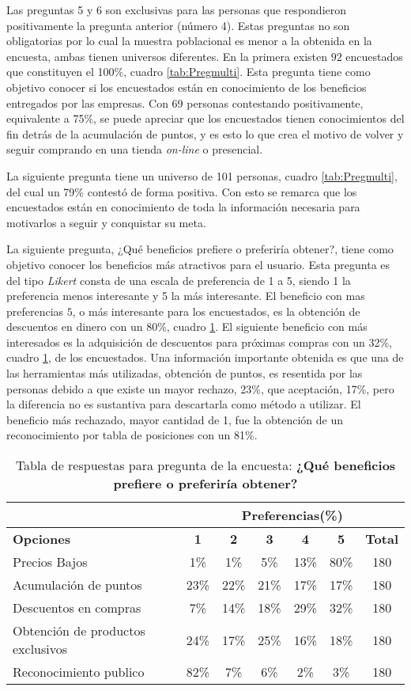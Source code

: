 Las preguntas 5 y 6 son exclusivas para las personas que respondieron positivamente
la pregunta anterior (número 4).
Estas preguntas no son obligatorias por lo cual la muestra poblacional
es menor a la obtenida en la encuesta, ambas tienen universos diferentes.
En la primera existen $92$ encuestados que constituyen el 100\%, cuadro \ref{tab:Pregmulti}.
Esta pregunta tiene como objetivo conocer si los encuestados están en conocimiento
de los beneficios entregados por las empresas.
Con 69 personas contestando positivamente, equivalente a 75\%, se puede apreciar
que los encuestados tienen conocimientos del fin detrás de la acumulación de puntos,
y es esto lo que crea el motivo de volver y seguir comprando en una tienda
\emph{on-line} o presencial.

La siguiente pregunta tiene un universo de 101 personas, cuadro \ref{tab:Pregmulti},
del cual un 79\% contestó de forma positiva.
Con esto se remarca que los encuestados están en conocimiento de toda la
información necesaria para motivarlos a seguir y conquistar su meta.

La siguiente pregunta,
¿Qué beneficios prefiere o preferiría obtener?,
tiene como objetivo conocer los  beneficios más atractivos para el usuario.
Esta pregunta es del tipo \emph{Likert} \cite{likert} consta de una escala de preferencia de
1 a 5, siendo 1 la preferencia menos interesante y 5 la más interesante.
El beneficio con mas preferencias $5$, o más interesante para los encuestados,
es la obtención de descuentos en dinero con un 80\%, cuadro \ref{tab:Preg7}.
El siguiente beneficio con más interesados es la adquisición de descuentos para
próximas compras con un 32\%, cuadro \ref{tab:Preg7}, de los encuestados.
Una información importante obtenida es que una de las herramientas más utilizadas,
obtención de puntos, es resentida por las personas debido a que existe un mayor
rechazo, 23\%, que aceptación, 17\%, pero la diferencia no es sustantiva para
descartarla como método a utilizar.
El beneficio más rechazado, mayor cantidad de 1, fue la obtención de un
reconocimiento por tabla de posiciones con un 81\%.

\begin{table}[h]
\centering
\footnotesize
\begin{tabular}{|l|c|c|c|c|c|c|}
\hline
 & \multicolumn{6}{c|}{{\bf Preferencias(\%)}} \\
\hline
{\bf Opciones} & {\bf 1} & {\bf 2} & {\bf 3} & {\bf 4} & {\bf 5} & {\bf Total}\\
\hline
Precios Bajos & 1\% & 1\% & 5\% & 13\% & 80\% & 180\\
\hline
Acumulación de puntos & 23\% & 22\% & 21\% & 17\% & 17\% & 180\\
\hline
Descuentos en compras & 7\% & 14\% & 18\% & 29\% & 32\% & 180\\
\hline
Obtención de productos exclusivos & 24\% & 17\% & 25\% & 16\% & 18\% & 180\\
\hline
Reconocimiento publico & 82\% & 7\% & 6\% & 2\% & 3\% & 180\\
\hline
\end{tabular}
\caption{Tabla de respuestas para pregunta de la encuesta: {\bf ¿Qué beneficios prefiere o preferiría obtener?}}
\label{tab:Preg7}
\end{table}

